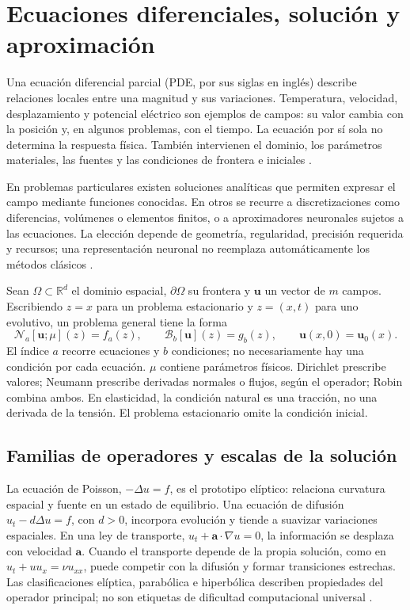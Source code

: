 \section{Ecuaciones diferenciales, solución y aproximación}
Una ecuación diferencial parcial (PDE, por sus siglas en inglés) describe relaciones locales entre una magnitud y sus variaciones. Temperatura, velocidad, desplazamiento y potencial eléctrico son ejemplos de campos: su valor cambia con la posición y, en algunos problemas, con el tiempo. La ecuación por sí sola no determina la respuesta física. También intervienen el dominio, los parámetros materiales, las fuentes y las condiciones de frontera e iniciales \cite{evans1998pde}.

En problemas particulares existen soluciones analíticas que permiten expresar el campo mediante funciones conocidas. En otros se recurre a discretizaciones como diferencias, volúmenes o elementos finitos, o a aproximadores neuronales sujetos a las ecuaciones. La elección depende de geometría, regularidad, precisión requerida y recursos; una representación neuronal no reemplaza automáticamente los métodos clásicos \cite{fenics2016,grossmann2024}.

Sean $\Omega\subset\mathbb R^d$ el dominio espacial, $\partial\Omega$ su frontera y $\mathbf u$ un vector de $m$ campos. Escribiendo $z=x$ para un problema estacionario y $z=(x,t)$ para uno evolutivo, un problema general tiene la forma
\begin{equation}
\mathcal N_a[\mathbf u;\mu](z)=f_a(z),\qquad
\mathcal B_b[\mathbf u](z)=g_b(z),\qquad
\mathbf u(x,0)=\mathbf u_0(x).
\label{eq:pde-general}
\end{equation}
El índice $a$ recorre ecuaciones y $b$ condiciones; no necesariamente hay una condición por cada ecuación. $\mu$ contiene parámetros físicos. Dirichlet prescribe valores; Neumann prescribe derivadas normales o flujos, según el operador; Robin combina ambos. En elasticidad, la condición natural es una tracción, no una derivada de la tensión. El problema estacionario omite la condición inicial.

\subsection{Familias de operadores y escalas de la solución}
La ecuación de Poisson, $-\Delta u=f$, es el prototipo elíptico: relaciona curvatura espacial y fuente en un estado de equilibrio. Una ecuación de difusión $u_t-d\Delta u=f$, con $d>0$, incorpora evolución y tiende a suavizar variaciones espaciales. En una ley de transporte, $u_t+\mathbf a\cdot\nabla u=0$, la información se desplaza con velocidad $\mathbf a$. Cuando el transporte depende de la propia solución, como en $u_t+u u_x=\nu u_{xx}$, puede competir con la difusión y formar transiciones estrechas. Las clasificaciones elíptica, parabólica e hiperbólica describen propiedades del operador principal; no son etiquetas de dificultad computacional universal \cite{evans1998pde}.

